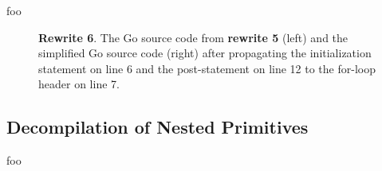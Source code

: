 foo

\begin{figure}[htbp]
	\centering
	\begin{subfigure}[t]{0.45\textwidth}
		
	\end{subfigure}
	\qquad
	\begin{subfigure}[t]{0.45\textwidth}
		
	\end{subfigure}
	\caption{\textbf{Rewrite 6}. The Go source code from \textbf{rewrite 5} (left) and the simplified Go source code (right) after propagating the initialization statement on line 6 and the post-statement on line 12 to the for-loop header on line 7.}
	\label{fig:rewrite_6}
\end{figure}


\subsection{Decompilation of Nested Primitives}

foo
